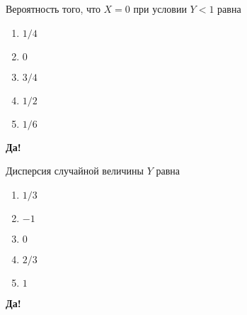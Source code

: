 \documentclass[t]{beamer}
\begin{document}
 \begin{frame} \label{30-Yes} 
\begin{block}{30} 

Вероятность того, что $X=0$ при условии $Y<1$ равна
  


 \end{block} 
\begin{enumerate} 
\item[] \hyperlink{30-Yes}{\beamergotobutton{} $1/4$}
\item[] \hyperlink{30-No}{\beamergotobutton{} $0$}
\item[] \hyperlink{30-No}{\beamergotobutton{} $3/4$
}
\item[] \hyperlink{30-No}{\beamergotobutton{} $1/2$}
\item[] \hyperlink{30-No}{\beamergotobutton{} $1/6$}
\end{enumerate} 

 \textbf{Да!} 
 \hyperlink{31}{}\end{frame} 


 \begin{frame} \label{31-Yes} 
\begin{block}{31} 

  Дисперсия случайной величины $Y$ равна
  


 \end{block} 
\begin{enumerate} 
\item[] \hyperlink{31-No}{\beamergotobutton{} $1/3$}
\item[] \hyperlink{31-No}{\beamergotobutton{} $-1$}
\item[] \hyperlink{31-No}{\beamergotobutton{} $0$}
\item[] \hyperlink{31-Yes}{\beamergotobutton{} $2/3$}
\item[] \hyperlink{31-No}{\beamergotobutton{} $1$}
\end{enumerate} 

 \textbf{Да!} 
 \hyperlink{32}{}\end{frame} 
\end{document}

